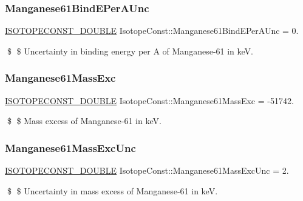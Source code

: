 \subsubsection{\texorpdfstring{Manganese61\+Bind\+E\+Per\+A\+Unc}{Manganese61BindEPerAUnc}}
{\footnotesize\ttfamily \mbox{\hyperlink{group___isotope_const-_macros_ga8f45a7272ce02c0b4c65c44636ed719a}{I\+S\+O\+T\+O\+P\+E\+C\+O\+N\+S\+T\+\_\+\+D\+O\+U\+B\+LE}} Isotope\+Const\+::\+Manganese61\+Bind\+E\+Per\+A\+Unc = 0.}

\$ \$ Uncertainty in binding energy per A of Manganese-\/61 in keV. \mbox{\label{group___isotope_const-_manganese-_mn61_ga18bc73e817aa126b47c26385b7513838}} 
\subsubsection{\texorpdfstring{Manganese61\+Mass\+Exc}{Manganese61MassExc}}
{\footnotesize\ttfamily \mbox{\hyperlink{group___isotope_const-_macros_ga8f45a7272ce02c0b4c65c44636ed719a}{I\+S\+O\+T\+O\+P\+E\+C\+O\+N\+S\+T\+\_\+\+D\+O\+U\+B\+LE}} Isotope\+Const\+::\+Manganese61\+Mass\+Exc = -\/51742.}

\$ \$ Mass excess of Manganese-\/61 in keV. \mbox{\label{group___isotope_const-_manganese-_mn61_gaf2f3060a2c15d3ab6fa9c02685675ac1}} 
\subsubsection{\texorpdfstring{Manganese61\+Mass\+Exc\+Unc}{Manganese61MassExcUnc}}
{\footnotesize\ttfamily \mbox{\hyperlink{group___isotope_const-_macros_ga8f45a7272ce02c0b4c65c44636ed719a}{I\+S\+O\+T\+O\+P\+E\+C\+O\+N\+S\+T\+\_\+\+D\+O\+U\+B\+LE}} Isotope\+Const\+::\+Manganese61\+Mass\+Exc\+Unc = 2.}

\$ \$ Uncertainty in mass excess of Manganese-\/61 in keV. \mbox{\label{group___isotope_const-_manganese-_mn61_ga9910a6de1f92d44636b71664dd8e5269}} 
